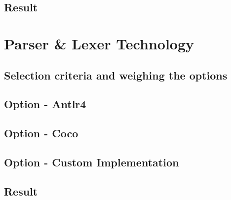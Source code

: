 \subsection{Result}



\section{Parser \& Lexer Technology}



\subsection{Selection criteria and weighing the options}



\subsection{Option - Antlr4}



\subsection{Option - Coco}



\subsection{Option - Custom Implementation}


\subsection{Result}


